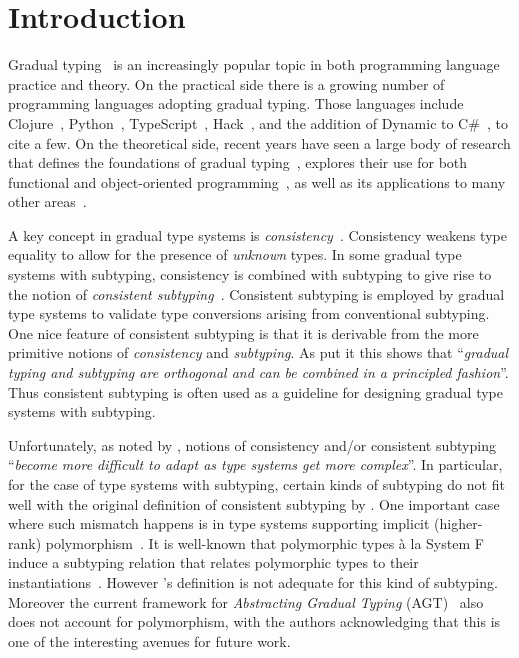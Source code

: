 \section{Introduction}
\label{sec:introduction}

Gradual typing~\citep{siek2006gradual} is an increasingly popular topic in both
programming language practice and theory. On the practical side there
is a growing
number of programming languages adopting gradual typing. Those languages include
Clojure~\citep{Bonnaire_Sergeant_2016}, Python~\citep{Vitousek_2014},
TypeScript~\citep{typescript}, Hack~\citep{verlaguet2013facebook}, and the
addition of Dynamic to C\#~\citep{Bierman_2010}, to cite a few. On the
theoretical side, recent years have seen a large body of research that defines
the foundations of gradual typing~\citep{garcia2016abstracting,
  cimini2016gradualizer, CiminiPOPL}, explores their use for both functional and
object-oriented programming~\citep{siek2006gradual, siek2007gradual}, as well as its applications
to many other areas~\citep{siek2016key, Ba_ados_Schwerter_2014}.

A key concept in gradual type systems is
\emph{consistency}~\citep{siek2006gradual}. Consistency weakens type equality to allow
for the presence of \emph{unknown} types. In some gradual type systems
with subtyping, consistency is combined with subtyping to give rise to
the notion of \emph{consistent subtyping}~\citep{siek2007gradual}. Consistent
subtyping is employed by gradual type systems to validate type
conversions arising from conventional subtyping. One nice feature of consistent
subtyping is that it is derivable from the more primitive
notions of \emph{consistency} %
and \emph{subtyping}. As \citet{siek2007gradual}
put it this shows that
``\emph{gradual typing and subtyping are orthogonal and can be combined in a principled fashion}''.
Thus consistent subtyping is often used as a guideline for
designing gradual type systems with subtyping. 

Unfortunately, as noted by \citet{garcia2016abstracting}, notions of
consistency and/or consistent subtyping ``\emph{become more difficult to adapt
  as type systems get more complex}''. In particular, for the case of type
systems with subtyping, certain kinds of subtyping do not fit well with the
original definition of consistent subtyping by \citet{siek2007gradual}. One
important case where such mismatch happens is in type systems supporting
implicit (higher-rank) polymorphism~\citep{jones2007practical,dunfield2013complete}.
It is well-known that polymorphic types
\`a la System F induce a subtyping relation that relates polymorphic types to
their instantiations~\citep{odersky1996putting, mitchell1990polymorphic}. However
\citeauthor{siek2007gradual}'s definition is not adequate for this kind of
subtyping. Moreover the current framework for \emph{Abstracting Gradual
Typing} (AGT)~\citep{garcia2016abstracting} also does not account for
polymorphism, with the authors
acknowledging that this is one of the interesting avenues for future work. 

